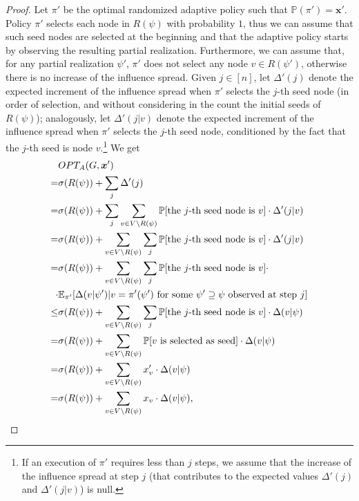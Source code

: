 \begin{proof}
Let $\pi'$ be the optimal randomized adaptive policy such that $\mathbb{P}(\pi')=\bm x'$. Policy $\pi'$ selects each node in $R(\psi)$ with probability $1$, thus we can assume that such seed nodes are selected at the beginning and that the adaptive policy starts by observing the resulting partial realization. Furthermore, we can assume that, for any partial realization $\psi'$, $\pi'$ does not select any node $v\in R(\psi')$, otherwise there is no increase of the influence spread. Given $j\in [n]$, let $\Delta'(j)$ denote the expected increment of the influence spread when $\pi'$ selects the $j$-th seed node (in order of selection, and without considering in the count the initial seeds of $R(\psi)$); analogously, let $\Delta'(j|v)$ denote the expected increment of the influence spread when $\pi'$ selects the $j$-th seed node, conditioned by the fact that the $j$-th seed is node $v$.\footnote{If an execution of $\pi'$ requires less than $j$ steps, we assume that the increase of the influence spread at step $j$ (that contributes to the expected values $\Delta'(j)$ and $\Delta'(j|v)$) is null.} We get
\begin{align}
 &OPT_A(G,\bm x')\nonumber\\
  =&\sigma(R(\psi))+\sum_j \Delta'(j)\nonumber\\
  =&\sigma(R(\psi))+\sum_j \sum_{v\in V\setminus R(\psi)}\mathbb{P}[\text{the $j$-th seed node is $v$}]\cdot \Delta'(j|v)\nonumber\\
  =&\sigma(R(\psi))+\sum_{v\in V\setminus R(\psi)}\sum_j \mathbb{P}[\text{the $j$-th seed node is $v$}]\cdot \Delta'(j|v)\nonumber\\
    =&\sigma(R(\psi))+\sum_{v\in V\setminus R(\psi)}\sum_j \mathbb{P}[\text{the $j$-th seed node is $v$}]\cdot\nonumber\\
    \cdot & \mathbb{E}_{\pi'}[\Delta(v|\psi')|\text{$v=\pi'(\psi')$ for some $\psi'\supseteq \psi$ observed at step $j$}]\nonumber\\
        \leq &\sigma(R(\psi))+\sum_{v\in V\setminus R(\psi)}\sum_j \mathbb{P}[\text{the $j$-th seed node is $v$}]\cdot \Delta(v|\psi)\label{eq3.0}\\
                =&\sigma(R(\psi))+\sum_{v\in V\setminus R(\psi)}\mathbb{P}[\text{$v$ is selected as seed}]\cdot \Delta(v|\psi)\nonumber\\
=& \sigma(R(\psi))+\sum_{v\in V\setminus R(\psi)}x_v'\cdot \Delta(v|\psi)\nonumber\\
= & \sigma(R(\psi))+\sum_{v\in V\setminus R(\psi)}x_v\cdot \Delta(v|\psi),\label{eq3}
\end{align}

\end{proof}
